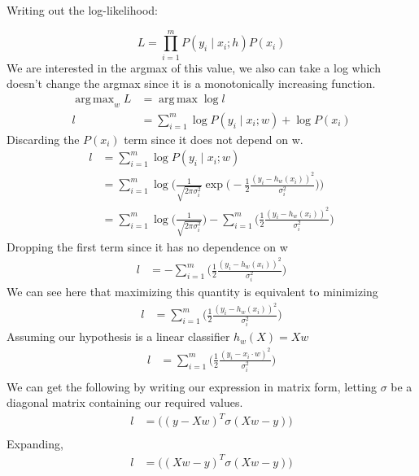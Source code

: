 \documentclass[12pt]{article}
\newenvironment{problem}[2][Problem]{\begin{trivlist}
\item[\hskip \labelsep {\bfseries #1}\hskip \labelsep {\bfseries #2.}]}{\end{trivlist}}
\DeclareMathOperator*{\argmax}{arg\,max}
\begin{document}
\begin{problem}{2.}
Writing out the log-likelihood:
\end{problem}
\[
    L = \prod_{i=1}^{m} P(y_i \mid x_i ; h ) P(x_i)
\]
We are interested in the argmax of this value, we 
also can take a log which doesn't change the argmax since it 
is a monotonically increasing function.
\begin{align*}
    \argmax_w L &= \argmax \log l \\
    l &= \sum_{i=1}^{m} \log P(y_i \mid x_i ; w ) + \log P(x_i)
\end{align*}
Discarding the $P(x_i)$ term since it does not depend on w.
\begin{align*}
    l &= \sum_{i=1}^{m} \log P(y_i \mid x_i ; w ) \\
      &= \sum_{i=1}^{m} \log \Bigg( \frac{1}{\sqrt{2\pi\sigma_i^2}} \exp \Big(-\frac{1}{2} \frac{(y_i - h_w(x_i))^2}{\sigma_i^2} \Big) \Bigg) \\ 
      &= \sum_{i=1}^{m} \log \Big( \frac{1}{\sqrt{2\pi\sigma_i^2}} \Big) - \sum_{i=1}^{m} \Big(\frac{1}{2} \frac{(y_i - h_w(x_i))^2}{\sigma_i^2} \Big)
\end{align*}
Dropping the first term since it has no dependence on w
\begin{align*}
    l  &= -\sum_{i=1}^{m} \Big(\frac{1}{2} \frac{(y_i - h_w(x_i))^2}{\sigma_i^2} \Big)
\end{align*}
We can see here that maximizing this quantity is equivalent to minimizing
\begin{align*}
    l  &= \sum_{i=1}^{m} \Big(\frac{1}{2} \frac{(y_i - h_w(x_i))^2}{\sigma_i^2} \Big)
\end{align*}
Assuming our hypothesis is a linear classifier $h_w(X) = Xw$
\begin{align*}
    l &= \sum_{i=1}^{m} \Big(\frac{1}{2} \frac{(y_i - x_i \cdot w)^2}{\sigma_i^2} \Big)\\
\end{align*} 
We can get the following by writing our expression in matrix form, letting $\sigma$ be
a diagonal matrix containing our required values. 
\begin{align*}
    l &= \Big((y - Xw)^T \sigma (Xw - y) \Big)\\
\end{align*}
Expanding, 
\begin{align*}
    l &= \Big((Xw - y)^T \sigma (Xw - y) \Big)\\
\end{align*}
\end{document}
